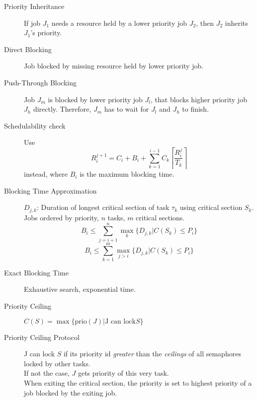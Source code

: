 \begin{description}
	\item[Priority Inheritance] If job $J_1$ needs a resource held by a lower
	priority job $J_2$, then $J_2$ inherits $J_1$'s priority.
	\item[Direct Blocking] Job blocked by missing resource held by lower priority
	job.
	\item[Push-Through Blocking] Job $J_m$ is blocked by lower priority job $J_l$,
	that blocks higher priority job $J_h$ directly. Therefore, $J_m$ has to wait
	for $J_l$ and $J_h$ to finish.
	\item[Schedulability check] Use 
	\[ R_i^{j+1} = C_i + B_i + \sum_{k=1}^{i-1} C_k \left\lceil \frac{R_i^j}
	{T_k} \right\rceil\]
	instead, where $B_i$ is the maximum blocking time.
	\item[Blocking Time Approximation] $D_{j,k}$: Duration of longest critical
	section of task $\tau_k$ using critical section $S_k$.\\
	Jobs ordered by priority, $n$ tasks, $m$ critical sections.
	\[ B_i \leq \sum_{j = i+1}^n \max_k\{ D_{j,k} | C(S_k) \leq P_i \} \]
	\[ B_i \leq \sum_{k = 1}^m \max_{j>i}\{ D_{j,k} | C(S_k) \leq P_i \} \]
	\item[Exact Blocking Time] Exhaustive search, exponential time.
	\item[Priority Ceiling] $C(S) = \max\{\text{prio}(J)|\text{J can lock} S \}$
	\item[Priority Ceiling Protocol] J can lock $S$ if its priority id \emph
	{greater} than the \emph{ceilings} of all semaphores locked by other tasks.\\
	If not the case, $J$ gets priority of this very task.\\
	When exiting the critical section, the priority is set to highest priority of a
	job blocked by the exiting job.
\end{description}

